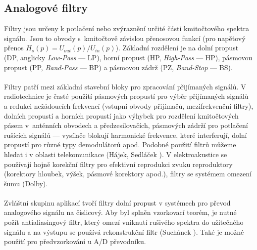 \subsection{Analogové filtry}
Filtry jsou určeny k potlačení nebo zvýraznění určité části kmitočtového spektra signálu. Jsou to obvody s~kmitočtově závislou přenosovou funkcí (pro napěťový přenos $H_s(p) = U_{out}(p)/U_{in}(p)$). Základní rozdělení je na dolní propust (DP, anglicky \textit{Low-Pass} --- LP), horní propust (HP, \textit{High-Pass} --- HP), pásmovou propust (PP, \textit{Band-Pass} --- BP) a pásmovou zádrž (PZ, \textit{Band-Stop} --- BS). \\
\\
Filtry patří mezi základní stavební bloky pro zpracování přijímaných signálů. V radiotechnice je časté použití pásmových propustí pro výběr přijímaných signálů a redukci nežádoucích frekvencí (vstupní obvody přijímačů, mezifrekvenční filtry), dolních propustí a horních propustí jako výhybek pro rozdělení kmitočtových pásem v~anténních obvodech a předzesilovačích, pásmových zádrží pro potlačení rušících signálů --- vysílače blokují harmonické frekvence, které interferují, dolní propustí pro různé typy demodulátorů apod. Podobné použití filtrů můžeme hledat i v oblasti telekomunikace (Hájek, Sedláček \cite{5}). V elektroakustice se používají hojně korekční filtry pro efektivní reprodukci zvuku reproduktory (korektory hloubek, výšek, pásmové korektory apod.), filtry se systémem omezení šumu (Dolby).\\
\\
Zvláštní skupinu aplikací tvoří filtry dolní propust v systémech pro převod analogového signálu na číslicový. Aby byl splněn vzorkovací teorém, je nutné požít antialiasingový filtr, který omezí vniknutí rušivého spektra do užitečného signálu a na výstupu se používá rekonstrukční filtr (Suchánek \cite{6}). Také je možné použití pro předvzorkování u A/D převodníku.\\
